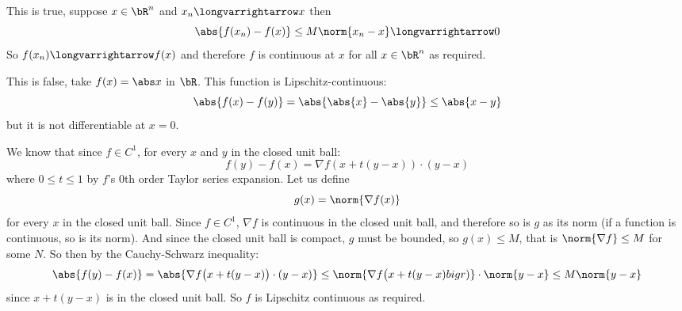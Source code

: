 \documentclass[10pt]{article}
\begin{document}
\begin{blankpp}

    \benum
        \item This is true, suppose $x\in\bR^n$ and $x_n\longvarrightarrow x$ then
        \[ \abs{f(x_n)-f(x)} \leq M\norm{x_n-x} \longvarrightarrow 0 \]
        So $f(x_n)\longvarrightarrow f(x)$ and therefore $f$ is continuous at $x$ for all $x\in\bR^n$ as required.
        \item This is false, take $f(x)=\abs x$ in $\bR$.
        This function is Lipschitz-continuous:
        \[ \abs{f(x)-f(y)} = \abs{\abs{x} - \abs{y}} \leq \abs{x-y} \]
        but it is not differentiable at $x=0$.
        \item We know that since $f\in C^1$, for every $x$ and $y$ in the closed unit ball:
        \[ f(y) - f(x) = \nabla f(x+t(y-x))\cdot(y-x) \]
        where $0\leq t\leq 1$ by $f$'s $0$th order Taylor series expansion.
        Let us define
        \[ g(x) = \norm{\nabla f(x)} \]
        for every $x$ in the closed unit ball.
        Since $f\in C^1$, $\nabla f$ is continuous in the closed unit ball, and therefore so is $g$ as its norm (if a function is continuous, so is its norm).
        And since the closed unit ball is compact, $g$ must be bounded, so $g(x)\leq M$, that is $\norm{\nabla f}\leq M$ for some $N$.
        So then by the Cauchy-Schwarz inequality:
        \[ \abs{f(y) - f(x)} = \abs{\nabla f\bigl(x+t(y-x)\bigr)\cdot(y-x)} \leq \norm{\nabla f\bigl(x+t(y-x)bigr)}\cdot\norm{y-x} \leq M\norm{y-x} \]
        since $x+t(y-x)$ is in the closed unit ball.
        So $f$ is Lipschitz continuous as required.
    \eenum

\end{blankpp}
\end{document}
